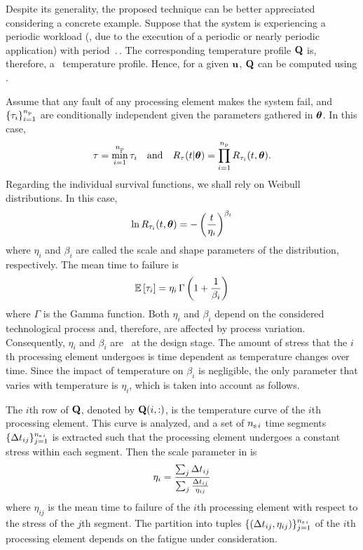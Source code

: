 Despite its generality, the proposed technique can be better appreciated considering a concrete example.
Suppose that the system is experiencing a periodic workload (\eg, due to the execution of a periodic or nearly periodic application) with period $\period$.
The corresponding temperature profile $\mQ$ is, therefore, a \dss\ temperature profile.
Hence, for a given $\vu$, $\mQ$ can be computed using .

Assume that any fault of any processing element makes the system fail, and $\{ \T_i \}_{i = 1}^\nprocs$ are conditionally independent given the parameters gathered in $\vwr$.
In this case,
\[
  \T = \min_{i = 1}^\nprocs \T_i \hspace{1em} \text{and} \hspace{1em} \survival_\T(\t | \vwr) = \prod_{i = 1}^\nprocs \survival_{\T_i}(\t, \vwr).
\]
Regarding the individual survival functions, we shall rely on Weibull distributions.
In this case,
\begin{equation} \elab{weibull-model}
  \ln \survival_{\T_i}(\t, \vwr) = -\left( \frac{\t}{\eta_i} \right)^{\beta_i}
\end{equation}
where $\eta_i$ and $\beta_i$ are called the scale and shape parameters of the distribution, respectively.
The mean time to failure is
\begin{equation} \elab{weibull-expectation}
  \expectation{\T_i} = \eta_i \, \Gamma\left(1 + \frac{1}{\beta_i}\right)
\end{equation}
where $\Gamma$ is the Gamma function.
Both $\eta_i$ and $\beta_i$ depend on the considered technological process and, therefore, are affected by process variation.
Consequently, $\eta_i$ and $\beta_i$ are \rvs\ at the design stage.
The amount of stress that the $i$th processing element undergoes is time dependent as temperature changes over time.
Since the impact of temperature on $\beta_i$ is negligible, the only parameter that varies with temperature is $\eta_i$, which is taken into account as follows.

The $i$th row of $\mQ$, denoted by $\mQ(i, :)$, is the temperature curve of the $i$th processing element.
This curve is analyzed, and a set of $\nsegments[i]$ time segments $\{ \dt_{ij} \}_{j = 1}^{\nsegments[i]}$ is extracted such that the processing element undergoes a constant stress within each segment.
Then the scale parameter in  is \cite{xiang2010}
\begin{equation} \elab{compound-weibull-eta}
  \eta_i = \frac{\sum_j \dt_{ij}}{\sum_j\frac{\dt_{ij}}{\eta_{ij}}}
\end{equation}
where $\eta_{ij}$ is the mean time to failure of the $i$th processing element with respect to the stress of the $j$th segment.
The partition into tuples $\{ (\dt_{ij}, \eta_{ij}) \}_{j = 1}^{\nsegments[i]}$ of the $i$th processing element depends on the fatigue under consideration.

